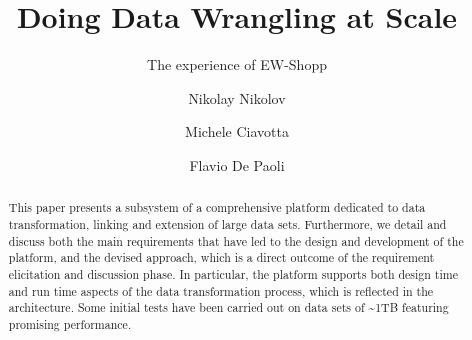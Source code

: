 \documentclass[sigconf, final]{acmart}
\begin{document}
\title{Doing Data Wrangling at Scale}
\subtitle{The experience of EW-Shopp}


\author{Nikolay Nikolov}

\author{Michele Ciavotta}

\author{Flavio De Paoli}



\renewcommand{\shortauthors}{N. Nikolov et al.}


\begin{abstract}
This paper presents a subsystem of a comprehensive platform dedicated to data transformation, linking and extension of large data sets. Furthermore, we detail and discuss both the main requirements that have led to the design and development of the platform, and the devised approach, which is a direct outcome of the requirement elicitation and discussion phase. In particular, the platform supports both design time and run time aspects of the data transformation process, which is reflected in the architecture. 
Some initial tests have been carried out on data sets of \textasciitilde 1TB featuring promising performance. 
\end{abstract}
\end{document}
